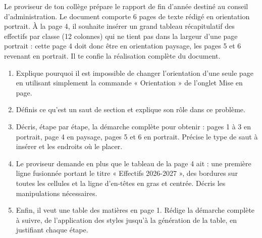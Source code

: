 \documentclass[11pt]{article}
\newcommand{\cle}[1]{{\popxbold\color{popdark}#1}}
\begin{document}
\begin{exercice}
Le proviseur de ton collège prépare le rapport de fin d'année destiné au conseil d'administration. Le document comporte 6 pages de texte rédigé en orientation portrait. À la page 4, il souhaite insérer un grand tableau récapitulatif des effectifs par classe (12 colonnes) qui ne tient pas dans la largeur d'une page portrait : cette page 4 doit donc être en orientation \cle{paysage}, les pages 5 et 6 revenant en portrait. Il te confie la réalisation complète du document.
\begin{enumerate}
\item Explique pourquoi il est impossible de changer l'orientation d'une seule page en utilisant simplement la commande « Orientation » de l'onglet Mise en page.
\item Définis ce qu'est un saut de section et explique son rôle dans ce problème.
\item Décris, étape par étape, la démarche complète pour obtenir : pages 1 à 3 en portrait, page 4 en paysage, pages 5 et 6 en portrait. Précise le type de saut à insérer et les endroits où le placer.
\item Le proviseur demande en plus que le tableau de la page 4 ait : une première ligne fusionnée portant le titre « Effectifs 2026-2027 », des bordures sur toutes les cellules et la ligne d'en-têtes en gras et centrée. Décris les manipulations nécessaires.
\item Enfin, il veut une table des matières en page 1. Rédige la démarche complète à suivre, de l'application des styles jusqu'à la génération de la table, en justifiant chaque étape.
\end{enumerate}
\end{exercice}
\end{document}
